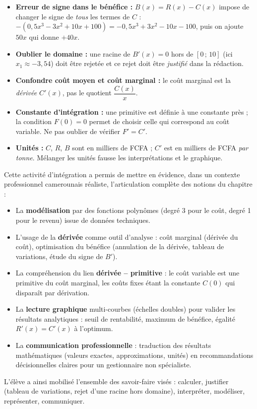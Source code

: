 \documentclass[11pt]{article}
\newcounter{popsec}
\newcounter{popsub}
\newcommand{\courssub}[1]{%
  \stepcounter{popsub}%
  \par\vspace{9pt}\noindent{\popxbold\fontsize{11.5}{13}\selectfont\color{popink}{\color{poporange}\thepopsec.\thepopsub}\hspace{6pt}#1}\par\nopagebreak\vspace{4pt}
}
\begin{document}
\begin{attention}
\begin{itemize}
    \item \textbf{Erreur de signe dans le bénéfice :} $B(x) = R(x) - C(x)$ impose de changer le signe de \emph{tous} les termes de $C$ : $-(0,5x^3 - 3x^2 + 10x + 100) = -0,5x^3 + 3x^2 - 10x - 100$, puis on ajoute $50x$ qui donne $+40x$.
    \item \textbf{Oublier le domaine :} une racine de $B'(x)=0$ hors de $[0\,;\,10]$ (ici $x_1 \approx -3,54$) doit être rejetée et ce rejet doit être \emph{justifié} dans la rédaction.
    \item \textbf{Confondre coût moyen et coût marginal :} le coût marginal est la \emph{dérivée} $C'(x)$, pas le quotient $\dfrac{C(x)}{x}$.
    \item \textbf{Constante d'intégration :} une primitive est définie à une constante près ; la condition $F(0)=0$ permet de choisir celle qui correspond au coût variable. Ne pas oublier de vérifier $F' = C'$.
    \item \textbf{Unités :} $C$, $R$, $B$ sont en milliers de FCFA ; $C'$ est en milliers de FCFA \emph{par tonne}. Mélanger les unités fausse les interprétations et le graphique.
\end{itemize}
\end{attention}

\courssub{Bilan de l'activité}
Cette activité d'intégration a permis de mettre en évidence, dans un contexte professionnel camerounais réaliste, l'articulation complète des notions du chapitre :
\begin{itemize}
    \item La \textbf{modélisation} par des fonctions polynômes (degré 3 pour le coût, degré 1 pour le revenu) issue de données techniques.
    \item L'usage de la \textbf{dérivée} comme outil d'analyse : coût marginal (dérivée du coût), optimisation du bénéfice (annulation de la dérivée, tableau de variations, étude du signe de $B'$).
    \item La compréhension du lien \textbf{dérivée -- primitive} : le coût variable est une primitive du coût marginal, les coûts fixes étant la constante $C(0)$ qui disparaît par dérivation.
    \item La \textbf{lecture graphique} multi-courbes (échelles doubles) pour valider les résultats analytiques : seuil de rentabilité, maximum de bénéfice, égalité $R'(x)=C'(x)$ à l'optimum.
    \item La \textbf{communication professionnelle} : traduction des résultats mathématiques (valeurs exactes, approximations, unités) en recommandations décisionnelles claires pour un gestionnaire non spécialiste.
\end{itemize}
L'élève a ainsi mobilisé l'ensemble des savoir-faire visés : calculer, justifier (tableau de variations, rejet d'une racine hors domaine), interpréter, modéliser, représenter, communiquer.
\end{document}
